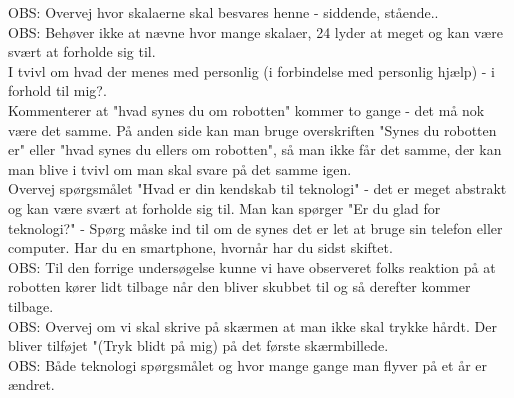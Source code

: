 OBS: Overvej hvor skalaerne skal besvares henne - siddende, stående..\\

OBS: Behøver ikke at nævne hvor mange skalaer, 24 lyder at meget og kan være svært at forholde sig til.\\ 

I tvivl om hvad der menes med personlig (i forbindelse med personlig hjælp) - i forhold til mig?.\\ 

Kommenterer at "hvad synes du om robotten" kommer to gange - det må nok være det samme. På anden side kan man bruge overskriften "Synes du robotten er" eller "hvad synes du ellers om robotten", så man ikke får det samme, der kan man blive i tvivl om man skal svare på det samme igen. \\

Overvej spørgsmålet "Hvad er din kendskab til teknologi" - det er meget abstrakt og kan være svært at forholde sig til. Man kan spørger "Er du glad for teknologi?" - Spørg måske ind til om de synes det er let at bruge sin telefon eller computer. Har du en smartphone, hvornår har du sidst skiftet. \\ 

OBS: Til den forrige undersøgelse kunne vi have observeret folks reaktion på at robotten kører lidt tilbage når den bliver skubbet til og så derefter kommer tilbage.\\

OBS: Overvej om vi skal skrive på skærmen at man ikke skal trykke hårdt.  Der bliver tilføjet "(Tryk blidt på mig) på det første skærmbillede.\\

OBS: Både teknologi spørgsmålet og hvor mange gange man flyver på et år er ændret. \\




 